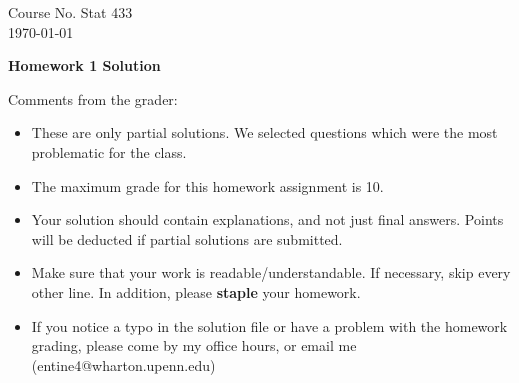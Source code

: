 \documentclass[10pt,a4paper]{article}
\begin{document}
\begin{flushleft}
Course No. Stat 433 \\
\today
\end{flushleft}

\begin{center}
{\Large{\bf  Homework 1 Solution}}
\end{center}

\textcolor[rgb]{0.98,0.00,0.00}{Comments from the grader:}
\begin{itemize}

    \item \textcolor[rgb]{0.98,0.00,0.00}{These are only partial solutions.  We selected
    questions which were the most problematic for the class.}
    \item \textcolor[rgb]{0.98,0.00,0.00}{The maximum grade for this homework assignment is 10.}
    \item \textcolor[rgb]{0.98,0.00,0.00}{Your solution should contain explanations, and not just
    final answers. Points will be deducted if partial solutions
    are submitted.}
    \item \textcolor[rgb]{0.98,0.00,0.00}{Make sure that your work is readable/understandable.  If necessary, skip every other line.  In addition, please {\bf staple} your homework.}
    \item \textcolor[rgb]{0.98,0.00,0.00}{If you notice a typo in the solution file or have a problem with the homework
    grading, please come by my office hours, or email me (entine4@wharton.upenn.edu)}

\end{itemize}
\end{document}
